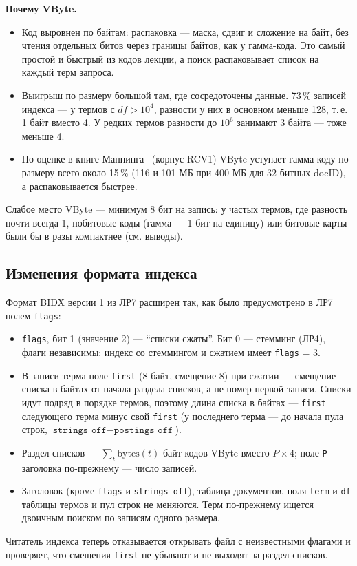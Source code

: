 \textbf{Почему VByte.}
\begin{itemize}
    \item Код выровнен по байтам: распаковка --- маска, сдвиг и сложение на байт, без чтения отдельных битов через границы байтов, как у гамма-кода. Это самый простой и быстрый из кодов лекции, а поиск распаковывает список на каждый терм запроса.
    \item Выигрыш по размеру большой там, где сосредоточены данные. 73\,\% записей индекса --- у термов с $df > 10^4$, разности у них в основном меньше 128, т.\,е. 1 байт вместо 4. У редких термов разности до $10^6$ занимают 3 байта --- тоже меньше 4.
    \item По оценке в книге Маннинга~\cite{Kormen} (корпус RCV1) VByte уступает гамма-коду по размеру всего около 15\,\% (116 и 101 МБ при 400 МБ для 32-битных docID), а распаковывается быстрее.
\end{itemize}
Слабое место VByte --- минимум 8 бит на запись: у частых термов, где разность почти всегда 1, побитовые коды (гамма --- 1 бит на единицу) или битовые карты были бы в разы компактнее (см. выводы).

\subsection{Изменения формата индекса}
Формат BIDX версии 1 из ЛР7 расширен так, как было предусмотрено в ЛР7 полем \texttt{flags}:
\begin{itemize}
    \item \texttt{flags}, бит 1 (значение 2) --- \enquote{списки сжаты}. Бит 0 --- стемминг (ЛР4), флаги независимы: индекс со стеммингом и сжатием имеет \texttt{flags} = 3.
    \item В записи терма поле \texttt{first} (8 байт, смещение 8) при сжатии --- смещение списка в байтах от начала раздела списков, а не номер первой записи. Списки идут подряд в порядке термов, поэтому длина списка в байтах --- \texttt{first} следующего терма минус свой \texttt{first} (у последнего терма --- до начала пула строк, $\texttt{strings\_off} - \texttt{postings\_off}$).
    \item Раздел списков --- $\sum_t \mathrm{bytes}(t)$ байт кодов VByte вместо $P \times 4$; поле \texttt{P} заголовка по-прежнему --- число записей.
    \item Заголовок (кроме \texttt{flags} и \texttt{strings\_off}), таблица документов, поля \texttt{term} и \texttt{df} таблицы термов и пул строк не меняются. Терм по-прежнему ищется двоичным поиском по записям одного размера.
\end{itemize}
Читатель индекса теперь отказывается открывать файл с неизвестными флагами и проверяет, что смещения \texttt{first} не убывают и не выходят за раздел списков.


